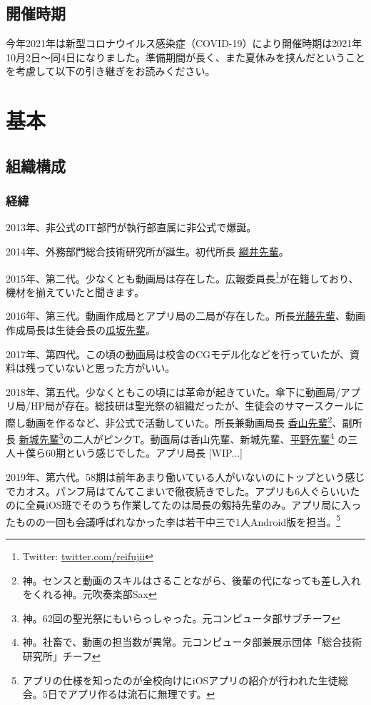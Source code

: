 \documentclass[dvipdfmx,jb5]{jarticle}
\newcommand{\mail}[2]{\href{mailto:#2}{#1}}
\begin{document}
\subsection{開催時期}
今年2021年は新型コロナウイルス感染症（COVID-19）により開催時期は2021年10月2日〜同4日になりました。準備期間が長く、また夏休みを挟んだということを考慮して以下の引き継ぎをお読みください。

\section{基本}
\subsection{組織構成}
\subsubsection{経緯}
2013年、非公式のIT部門が執行部直属に非公式で爆誕。

2014年、外務部門総合技術研究所が誕生。初代所長 \mail{綱井先輩}{53127tsunai@seiko.ac.jp}。

2015年、第二代。少なくとも動画局は存在した。広報委員長\footnote{Twitter: \url{twitter.com/reifujii}}が在籍しており、機材を揃えていたと聞きます。

2016年、第三代。動画作成局とアプリ局の二局が存在した。所長\mail{光藤先輩}{55201mitsudo@seiko.ac.jp}、動画作成局長は生徒会長の\mail{瓜坂先輩}{55031urisaka@seiko.ac.jp}。

2017年、第四代。この頃の動画局は校舎のCGモデル化などを行っていたが、資料は残っていないと思った方がいい。

2018年、第五代。少なくともこの頃には革命が起きていた。傘下に動画局/アプリ局/HP局が存在。総技研は聖光祭の組織だったが、生徒会のサマースクールに際し動画を作るなど、非公式で活動していた。所長兼動画局長 \mail{香山先輩}{57084koyama@seiko.ac.jp}\footnote{神。センスと動画のスキルはさることながら、後輩の代になっても差し入れをくれる神。元吹奏楽部Sax}、副所長 \mail{新城先輩}{57011araki@seiko.ac.jp}\footnote{神。62回の聖光祭にもいらっしゃった。元コンピュータ部サブチーフ}の二人がピンクT。動画局は香山先輩、新城先輩、\mail{平野先輩}{57174hirano@seiko.ac.jp}\footnote{ 神。社畜で、動画の担当数が異常。元コンピュータ部兼展示団体「総合技術研究所」チーフ} の三人＋僕ら60期という感じでした。アプリ局長 [WIP...]

2019年、第六代。58期は前年あまり働いている人がいないのにトップという感じでカオス。パンフ局はてんてこまいで徹夜続きでした。アプリも6人ぐらいいたのに全員iOS班でそのうち作業してたのは局長の剱持先輩のみ。アプリ局に入ったものの一回も会議呼ばれなかった李は若干中三で1人Android版を担当。\footnote{アプリの仕様を知ったのが全校向けにiOSアプリの紹介が行われた生徒総会。5日でアプリ作るは流石に無理です。}
\end{document}
